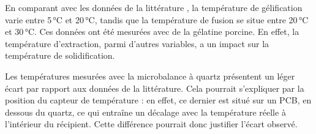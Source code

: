 En comparant avec les données de la littérature \cite{SHA2019163}, la température de gélification varie entre 5 °C et 20 °C, tandis que la température de fusion se situe entre 20 °C et 30 °C. Ces données ont été mesurées avec de la gélatine porcine. En effet, la température d’extraction, parmi d’autres variables, a un impact sur la température de solidification.

Les températures mesurées avec la microbalance à quartz présentent un léger écart par rapport aux données de la littérature. Cela pourrait s’expliquer par la position du capteur de température : en effet, ce dernier est situé sur un PCB, en dessous du quartz, ce qui entraîne un décalage avec la température réelle à l’intérieur du récipient. Cette différence pourrait donc justifier l’écart observé.


